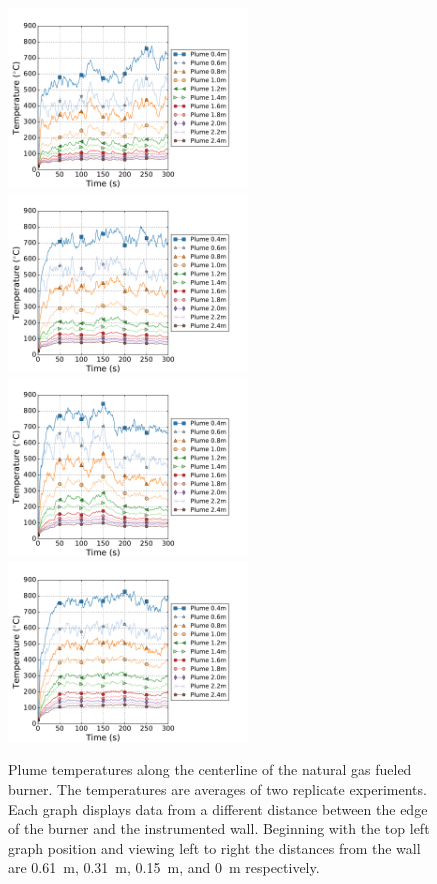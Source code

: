 \documentclass[twoside]{uocthesis}
\begin{document}
{\begin{figure}[ht!]
	\centering
	\includegraphics[width=2.5in]{../Figures/TWNG01_TC_Plume_Avg}
	\includegraphics[width=2.5in]{../Figures/TWNG03_TC_Plume_Avg}\\
	\includegraphics[width=2.5in]{../Figures/TWNG05_TC_Plume_Avg}
	\includegraphics[width=2.5in]{../Figures/TWNG07_TC_Plume_Avg}\\
	\caption[Plume temperatures along the centerline of the natural gas fueled burner]{Plume temperatures along the centerline of the natural gas fueled burner. The temperatures are averages of two replicate experiments. Each graph displays data from a different distance between the edge of the burner and the instrumented wall.  Beginning with the top left graph position and viewing left to right the distances from the wall are 0.61~m, 0.31~m, 0.15~m, and 0~m respectively.}
	\label{TC_Plume_TWNG_comp}
\end{figure}

}
\end{document}
